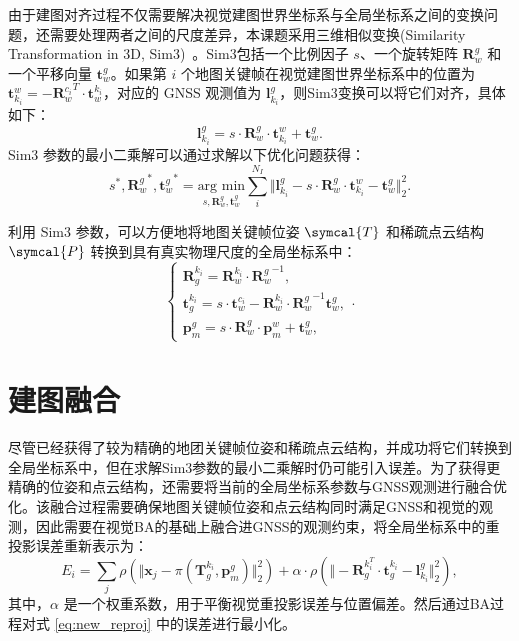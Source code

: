 由于建图对齐过程不仅需要解决视觉建图世界坐标系与全局坐标系之间的变换问题，还需要处理两者之间的尺度差异，本课题采用三维相似变换(Similarity Transformation in 3D, Sim3)~\cite{horn1987closed}。Sim3包括一个比例因子 $s$、一个旋转矩阵 $\symbf{R}_w^g$ 和一个平移向量 $\symbf{t}_w^g$。如果第 $i$ 个地图关键帧在视觉建图世界坐标系中的位置为 $\symbf{t}_{k_i}^{w} = -{\symbf{R}_w^{c_i}}^T \cdot \symbf{t}_w^{k_i}$，对应的 GNSS 观测值为 $\symbf{l}_{k_i}^g$，则Sim3变换可以将它们对齐，具体如下：
\begin{equation}
    \symbf{l}_{k_i}^g = s \cdot \symbf{R}_w^g \cdot \symbf{t}_{k_i}^{w} + \symbf{t}_w^g.
\end{equation}
Sim3 参数的最小二乘解可以通过求解以下优化问题获得：
\begin{equation}
  s^*, {\symbf{R}_w^g}^*, {\symbf{t}_w^g}^* = \underset{s,\symbf{R}_w^g,\symbf{t}_w^g}{\text{arg min}} \sum_i^{N_I} \Vert \symbf{l}_{k_i}^g - s \cdot \symbf{R}_w^g \cdot \symbf{t}_{k_i}^{w} - \symbf{t}_w^g \Vert_2^2.
\end{equation}

利用 Sim3 参数，可以方便地将地图关键帧位姿 $\symcal{T}$ 和稀疏点云结构 $\symcal{P}$ 转换到具有真实物理尺度的全局坐标系中：
\begin{equation}
\begin{cases}
    \symbf{R}^{k_i}_g = {\symbf{R}^{k_i}_{w}} \cdot {\symbf{R}_w^g}^{-1}, \\
    \symbf{t}^{k_i}_g = s \cdot \symbf{t}_w^{c_i} - {\symbf{R}^{k_i}_{w}} \cdot {\symbf{R}^{g}_{w}}^{-1} \symbf{t}_w^g, \\
    \symbf{p}_m^g = s \cdot \symbf{R}_w^g \cdot \symbf{p}_{m}^{w} + \symbf{t}_w^g,
\end{cases}.
\end{equation}

\section{建图融合}

尽管已经获得了较为精确的地团关键帧位姿和稀疏点云结构，并成功将它们转换到全局坐标系中，但在求解Sim3参数的最小二乘解时仍可能引入误差。为了获得更精确的位姿和点云结构，还需要将当前的全局坐标系参数与GNSS观测进行融合优化。该融合过程需要确保地图关键帧位姿和点云结构同时满足GNSS和视觉的观测，因此需要在视觉BA的基础上融合进GNSS的观测约束，将全局坐标系中的重投影误差重新表示为：
\begin{equation}
\label{eq:new_reproj}
    E_i = \sum_{j}\rho\left(\Vert \symbf{x}_j - \pi(\symbf{T}^{k_i}_g, \symbf{p}_{m}^{g}) \Vert ^2_2\right) 
    + \alpha \cdot \rho\left(\Vert -\symbf{R}_g^{k_i^T}\cdot\symbf{t}_g^{k_i} - \symbf{l}_{k_i}^g \Vert_2^2\right),
\end{equation}
其中，$\alpha$ 是一个权重系数，用于平衡视觉重投影误差与位置偏差。然后通过BA过程对式 \eqref{eq:new_reproj} 中的误差进行最小化。

